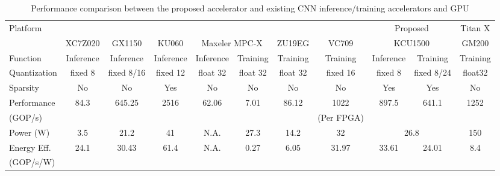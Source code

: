 \begin{table*}[htbp]
    \centering
    \caption{Performance comparison between the proposed accelerator and existing CNN inference/training accelerators and GPU}
      \begin{tabular}{|l|c|c|c|c|c|c|c|c|c|c|}
      \hline
      \multirow{2}[4]{*}{Platform} & \cite{guo2017angel} & \cite{ma2017optimizing} & \cite{han2017ese} & \multicolumn{2}{c|}{\cite{zhao2016f}} & \cite{liu2017fpga} & \cite{geng2018fpdeep} & \multicolumn{2}{c|}{Proposed} & Titan X \\
  \cline{2-10}          & \multicolumn{1}{l|}{XC7Z020} & GX1150 & KU060 & \multicolumn{2}{c|}{Maxeler MPC-X} & ZU19EG & VC709 & \multicolumn{2}{c|}{KCU1500} &  GM200 \\
      \hline
      Function & Inference & Inference & Inference & Inference & Training & Training & Training & Inference & Training & Training \\
      \hline
      Quantization & fixed 8 & fixed 8/16 & fixed 12 & float 32 & float 32 & float 32 & fixed 16 & fixed 8 & fixed 8/24 & float32 \\
      \hline
      Sparsity & No    & No    & Yes   & No    & No    & No    & No    & Yes   & Yes   & No \\
      \hline
      Performance & \multirow{2}[2]{*}{84.3} & \multirow{2}[2]{*}{645.25} & \multirow{2}[2]{*}{2516} & \multirow{2}[2]{*}{62.06} & \multirow{2}[2]{*}{7.01} & \multirow{2}[2]{*}{86.12} & 1022  & \multirow{2}[2]{*}{897.5} & \multirow{2}[2]{*}{641.1} & \multirow{2}[2]{*}{1252} \\
      (GOP/s) &       &       &       &       &       &       & (Per FPGA) &       &       &  \\
      \hline
      Power (W) & 3.5   & 21.2  & 41    & N.A.  & 27.3  & 14.2  & 32    & \multicolumn{2}{c|}{26.8} & 150 \\
      \hline
      Energy Eff. & \multirow{2}[2]{*}{24.1} & \multirow{2}[2]{*}{30.43} & \multirow{2}[2]{*}{61.4} & \multirow{2}[2]{*}{N.A.} & \multirow{2}[2]{*}{0.27} & \multirow{2}[2]{*}{6.05} & \multirow{2}[2]{*}{31.97} & \multirow{2}[2]{*}{33.61} & \multirow{2}[2]{*}{24.01} & \multirow{2}[2]{*}{8.4} \\
      (GOP/s/W) &       &       &       &       &       &       &       &       &       &  \\
      \hline
      \end{tabular}%
    \label{tab:perf_compare}%
\end{table*}%